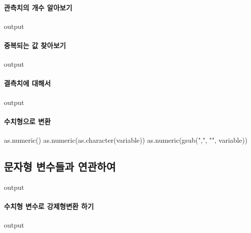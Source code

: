 \documentclass{book}
\begin{document}
\paragraph{관측치의 개수 알아보기}

\begin{Schunk}
\begin{Soutput}
output
\end{Soutput}
\end{Schunk}

\paragraph{중복되는 값 찾아보기}
\begin{Schunk}
\begin{Soutput}
output
\end{Soutput}
\end{Schunk}

\paragraph{결측치에 대해서}
\begin{Schunk}
\begin{Soutput}
output
\end{Soutput}
\end{Schunk}

\paragraph{수치형으로 변환}

\begin{Schunk}
\begin{Soutput}
as.numeric()
as.numeric(as.character(variable))
as.numeric(gsub(",", "", variable))
\end{Soutput}
\end{Schunk}



\subsection{문자형 변수들과 연관하여}

\begin{Schunk}
\begin{Soutput}
output
\end{Soutput}
\end{Schunk}

\paragraph{수치형 변수로 강제형변환 하기}
\begin{Schunk}
\begin{Soutput}
output
\end{Soutput}
\end{Schunk}
\end{document}
